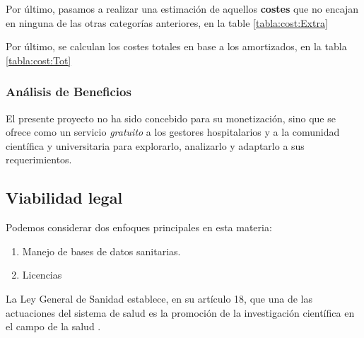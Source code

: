Por último, pasamos a realizar una estimación de aquellos \textbf{costes} que no encajan en ninguna de las otras categorías anteriores, en la table \ref{tabla:cost:Extra}



Por último, se calculan los costes totales en base a los amortizados, en la tabla \ref{tabla:cost:Tot}


\subsubsection{Análisis de Beneficios}

El presente proyecto no ha sido concebido para su monetización, sino que se ofrece como un servicio \textit{gratuito} a los gestores hospitalarios y a la comunidad científica y universitaria para explorarlo, analizarlo y adaptarlo a sus requerimientos.

\newpage

\subsection{Viabilidad legal}

Podemos considerar dos enfoques principales en esta materia:
\begin{enumerate}
    \item Manejo de bases de datos sanitarias.
    \item Licencias
\end{enumerate}

La Ley General de Sanidad establece, en su artículo 18, que una de las actuaciones del sistema de salud es la promoción de la investigación científica en el campo de la salud \cite{GarridoElustondo2012InvestigacionPrimaria}.

